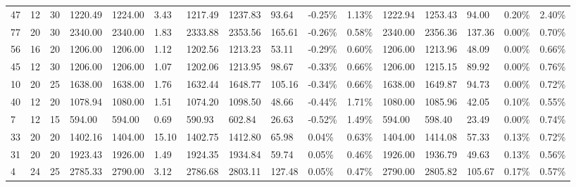\begin{longtable}{l|ll|lll|lllll|lllll}
   47 & 12                         & 30                         & 1220.49                   & 1224.00     & 3.43                & 1217.49 & 1237.83 & 93.64  & -0.25\% & 1.13\% & 1222.94 & 1253.43 & 94.00  & 0.20\%  & 2.40\% \\
   77 & 20                         & 30                         & 2340.00                   & 2340.00     & 1.83                & 2333.88 & 2353.56 & 165.61 & -0.26\% & 0.58\% & 2340.00 & 2356.36 & 137.36 & 0.00\%  & 0.70\% \\
   56 & 16                         & 20                         & 1206.00                   & 1206.00     & 1.12                & 1202.56 & 1213.23 & 53.11  & -0.29\% & 0.60\% & 1206.00 & 1213.96 & 48.09  & 0.00\%  & 0.66\% \\
   45 & 12                         & 30                         & 1206.00                   & 1206.00     & 1.07                & 1202.06 & 1213.95 & 98.67  & -0.33\% & 0.66\% & 1206.00 & 1215.15 & 89.92  & 0.00\%  & 0.76\% \\
   10 & 20                         & 25                         & 1638.00                   & 1638.00     & 1.76                & 1632.44 & 1648.77 & 105.16 & -0.34\% & 0.66\% & 1638.00 & 1649.87 & 94.73  & 0.00\%  & 0.72\% \\
   40 & 12                         & 20                         & 1078.94                   & 1080.00     & 1.51                & 1074.20 & 1098.50 & 48.66  & -0.44\% & 1.71\% & 1080.00 & 1085.96 & 42.05  & 0.10\%  & 0.55\% \\
   7  & 12                         & 15                         & 594.00                    & 594.00      & 0.69                & 590.93  & 602.84  & 26.63  & -0.52\% & 1.49\% & 594.00  & 598.40  & 23.49  & 0.00\%  & 0.74\% \\
   33 & 20                         & 20                         & 1402.16                   & 1404.00     & 15.10               & 1402.75 & 1412.80 & 65.98  & 0.04\%  & 0.63\% & 1404.00 & 1414.08 & 57.33  & 0.13\%  & 0.72\% \\
   31 & 20                         & 20                         & 1923.43                   & 1926.00     & 1.49                & 1924.35 & 1934.84 & 59.74  & 0.05\%  & 0.46\% & 1926.00 & 1936.79 & 49.63  & 0.13\%  & 0.56\% \\
   4  & 24                         & 25                         & 2785.33                   & 2790.00     & 3.12                & 2786.68 & 2803.11 & 127.48 & 0.05\%  & 0.47\% & 2790.00 & 2805.82 & 105.67 & 0.17\%  & 0.57\% \\

\end{longtable}
